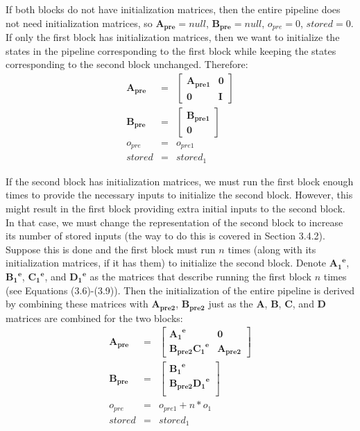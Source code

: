     If both blocks do not have initialization matrices, then the entire
pipeline does not need initialization matrices, so
$\mathbf{A_{pre}} = null$, $\mathbf{B_{pre}} = null$, $o_{pre} =
0$, $stored = 0$. If only the first block has initialization
matrices, then we want to initialize the states in the pipeline
corresponding to the first block while keeping the states
corresponding to the second block unchanged. Therefore:
\begin{eqnarray*}
\mathbf{A_{pre}} & = & \left [ \begin{array} {cc}
\mathbf{A_{pre1}} & \mathbf{0} \\ \mathbf{0} & \mathbf{I} \end{array} \right ] \\
\mathbf{B_{pre}} & = & \left [ \begin{array} {c} \mathbf{B_{pre1}} \\ \mathbf{0} \end{array} \right ] \\
o_{pre} & = & o_{pre1} \\
stored & = & stored_1
\end{eqnarray*}

    If the second block has initialization matrices, we must run
the first block enough times to provide the necessary inputs to
initialize the second block. However, this might result in the
first block providing extra initial inputs to the second block. In
that case, we must change the representation of the second block
to increase its number of stored inputs (the way to do this is
covered in Section 3.4.2). Suppose this is done and the first
block must run $n$ times (along with its initialization matrices,
if it has them) to initialize the second block. Denote
$\mathbf{{A_1}^e}$, $\mathbf{{B_1}^e}$, $\mathbf{{C_1}^e}$, and
$\mathbf{{D_1}^e}$ as the matrices that describe running the first
block $n$ times (see Equations (3.6)-(3.9)). Then the
initialization of the entire pipeline is derived by combining
these matrices with $\mathbf{A_{pre2}}$, $\mathbf{B_{pre2}}$ just
as the $\mathbf{A}$, $\mathbf{B}$, $\mathbf{C}$, and $\mathbf{D}$
matrices are combined for the two blocks:
\begin{eqnarray*}
\mathbf{A_{pre}} & = & \left [ \begin{array} {cc}
\mathbf{{A_1}^e} & \mathbf{0} \\
\mathbf{B_{pre2}} \mathbf{{C_1}^e} & \mathbf{A_{pre2}} \end{array} \right ] \\
\mathbf{B_{pre}} & = & \left [ \begin{array} {c}
\mathbf{{B_1}^e} \\ \mathbf{B_{pre2}} \mathbf{{D_1}^e} \\ \end{array} \right ] \\
o_{pre} & = & o_{pre1} + n*o_1 \\
stored & = & stored_1
\end{eqnarray*}

